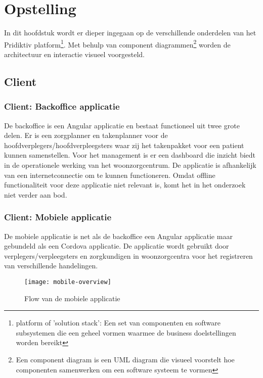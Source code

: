 
\chapter{Opstelling}
\label{ch:setup}

In dit hoofdstuk wordt er dieper ingegaan op de verschillende onderdelen van het Pridiktiv platform\footnote{platform of 'solution stack': Een set van componenten en software subsystemen die een geheel vormen waarmee de business doelstellingen worden bereikt}. Met behulp van component diagrammen\footnote{Een component diagram is een UML diagram die visueel voorstelt hoe componenten samenwerken om een software systeem te vormen} worden de architectuur en interactie visueel voorgesteld.
\section{Client}
\subsection{Client: Backoffice applicatie}
De backoffice is een Angular applicatie en bestaat functioneel uit twee grote delen. Er is een zorgplanner en takenplanner voor de hoofdverplegers/hoofdverpleegsters waar zij het takenpakket voor een patient kunnen samenstellen. Voor het management is er een dashboard die inzicht biedt in de operationele werking van het woonzorgcentrum. De applicatie is afhankelijk van een internetconnectie om te kunnen functioneren. Omdat offline functionaliteit voor deze applicatie niet relevant is, komt het in het onderzoek niet verder aan bod.
\subsection{Client: Mobiele applicatie}
De mobiele applicatie is net als de backoffice een Angular applicatie maar gebundeld als een Cordova applicatie. De applicatie wordt gebruikt door verplegers/verpleegsters en zorgkundigen in woonzorgcentra voor het registreren van verschillende handelingen.

\begin{figure}[h]
\caption{Flow van de mobiele applicatie}
\centering
\texttt{[image: mobile-overview]}
\end{figure}

